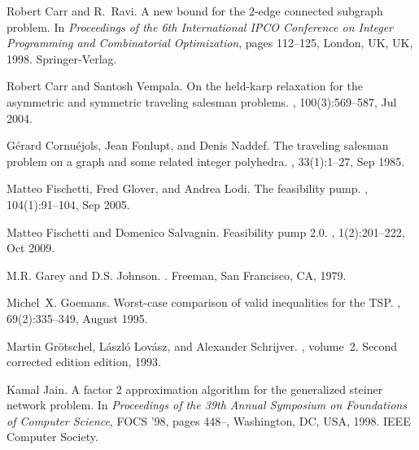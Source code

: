 \documentclass[runningheads]{llncs}
\begin{document}
%
%
%
% 
% 
%
\begin{thebibliography}{10}
	
	Robert Carr and R.~Ravi.
	\newblock A new bound for the 2-edge connected subgraph problem.
	\newblock In {\em Proceedings of the 6th International IPCO Conference on
		Integer Programming and Combinatorial Optimization}, pages 112--125, London,
	UK, UK, 1998. Springer-Verlag.
	
	Robert Carr and Santosh Vempala.
	\newblock On the held-karp relaxation for the asymmetric and symmetric
	traveling salesman problems.
	, 100(3):569--587, Jul 2004.
	
	G{\'e}rard Cornu{\'e}jols, Jean Fonlupt, and Denis Naddef.
	\newblock The traveling salesman problem on a graph and some related integer
	polyhedra.
	, 33(1):1--27, Sep 1985.
	
	Matteo Fischetti, Fred Glover, and Andrea Lodi.
	\newblock The feasibility pump.
	, 104(1):91--104, Sep 2005.
	
	Matteo Fischetti and Domenico Salvagnin.
	\newblock Feasibility pump 2.0.
	, 1(2):201--222, Oct 2009.
	
	M.R. Garey and D.S. Johnson.
	.
	\newblock Freeman, San Francisco, CA, 1979.
	
	Michel~X. Goemans.
	\newblock Worst-case comparison of valid inequalities for the {TSP}.
	, 69(2):335--349, August 1995.
	
	Martin Gr{\"o}tschel, L{\'a}szl{\'o} Lov{\'a}sz, and Alexander Schrijver.
	, volume~2.
	\newblock Second corrected edition edition, 1993.
	
	Kamal Jain.
	\newblock A factor 2 approximation algorithm for the generalized steiner
	network problem.
	\newblock In {\em Proceedings of the 39th Annual Symposium on Foundations of
		Computer Science}, FOCS '98, pages 448--, Washington, DC, USA, 1998. IEEE
	Computer Society.
	

\end{thebibliography}
\end{document}

